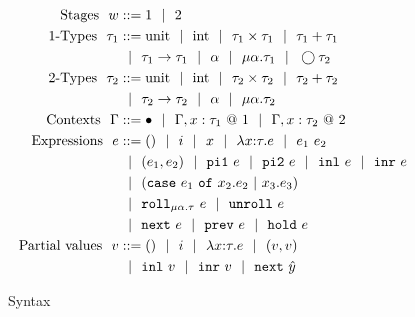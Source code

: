 \begin{figure}
\[\begin{aligned}
\text{Stages}\ \ 
\world &::= \bbone \gbar \bbtwo \\
%
\text{\bbone-Types}\ \ 
\type_1 &::= \text{unit}\gbar\text{int}%
 \gbar \type_1 \times \type_1
 \gbar \type_1 + \type_1 \\
&\gbar \type_1 \to \type_1
 \gbar \alpha \gbar \mu \alpha.\tau_1
 \gbar \fut \type_2 \\
%
\text{\bbtwo-Types}\ \ 
\type_2 &::= \text{unit}\gbar\text{int}%
 \gbar \type_2 \times \type_2
 \gbar \type_2 + \type_2 \\
&\gbar \type_2 \to \type_2
 \gbar \alpha \gbar \mu \alpha.\tau_2 \\
%
\text{Contexts}\ \ 
\context &::=\emptyC
 \gbar \context, x:\tau_1~@~\bbone
 \gbar \context, x:\tau_2~@~\bbtwo \\
%
\text{Expressions}\ \ 
\expr &::= ()\gbar\inte\gbar\var%
 \gbar \lam{\var}{\type}{\expr} 
 \gbar \expr_1~\expr_2 \\
&\gbar (\expr_1, \expr_2) 
 \gbar \pio~\expr 
 \gbar \pit~\expr
 \gbar \inl~\expr 
 \gbar \inr~\expr \\
&\gbar (\caseof {\expr_1}{\var_2.\expr_2}{\var_3.\expr_3})
\\ %
&\gbar \roll_{\mu \alpha.\tau}~e
 \gbar \unroll~e\\
&\gbar \next~\expr 
 \gbar \prev~\expr 
 \gbar \pause~\expr \\
%
\text{Partial values}\ \ 
v &::= ()\gbar\inte%
 \gbar \lam{\var}{\type}{\expr} 
 \gbar (v,v) \\
&\gbar \inl~v
 \gbar \inr~v
 \gbar \next~{\hat y} 
\end{aligned}\]
\caption{\lang~Syntax}
\label{fig:grammar}
\end{figure}

